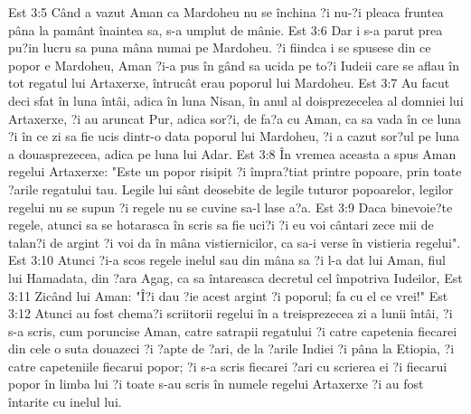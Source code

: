 Est 3:5  Când a vazut Aman ca Mardoheu nu se închina ?i nu-?i pleaca fruntea pâna la pamânt înaintea sa, s-a umplut de mânie.
Est 3:6  Dar i s-a parut prea pu?in lucru sa puna mâna numai pe Mardoheu. ?i fiindca i se spusese din ce popor e Mardoheu, Aman ?i-a pus în gând sa ucida pe to?i Iudeii care se aflau în tot regatul lui Artaxerxe, întrucât erau poporul lui Mardoheu.
Est 3:7  Au facut deci sfat în luna întâi, adica în luna Nisan, în anul al doisprezecelea al domniei lui Artaxerxe, ?i au aruncat Pur, adica sor?i, de fa?a cu Aman, ca sa vada în ce luna ?i în ce zi sa fie ucis dintr-o data poporul lui Mardoheu, ?i a cazut sor?ul pe luna a douasprezecea, adica pe luna lui Adar.
Est 3:8  În vremea aceasta a spus Aman regelui Artaxerxe: "Este un popor risipit ?i împra?tiat printre popoare, prin toate ?arile regatului tau. Legile lui sânt deosebite de legile tuturor popoarelor, legilor regelui nu se supun ?i regele nu se cuvine sa-l lase a?a.
Est 3:9  Daca binevoie?te regele, atunci sa se hotarasca în scris sa fie uci?i ?i eu voi cântari zece mii de talan?i de argint ?i voi da în mâna vistiernicilor, ca sa-i verse în vistieria regelui".
Est 3:10  Atunci ?i-a scos regele inelul sau din mâna sa ?i l-a dat lui Aman, fiul lui Hamadata, din ?ara Agag, ca sa întareasca decretul cel împotriva Iudeilor,
Est 3:11  Zicând lui Aman: "Î?i dau ?ie acest argint ?i poporul; fa cu el ce vrei!"
Est 3:12  Atunci au fost chema?i scriitorii regelui în a treisprezecea zi a lunii întâi, ?i s-a scris, cum poruncise Aman, catre satrapii regatului ?i catre capetenia fiecarei din cele o suta douazeci ?i ?apte de ?ari, de la ?arile Indiei ?i pâna la Etiopia, ?i catre capeteniile fiecarui popor; ?i s-a scris fiecarei ?ari cu scrierea ei ?i fiecarui popor în limba lui ?i toate s-au scris în numele regelui Artaxerxe ?i au fost întarite cu inelul lui.
